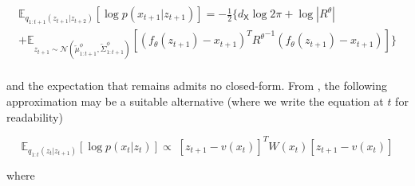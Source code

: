 \documentclass{article}
\newcommand{\1}{\mathbbm{1}}
\newcommand{\eqsp}{\;}
\newcommand{\expect}[2]{\mathbb{E}_{#1}\left[#2\right]}
\newcommand{\gaussian}[2]{\mathcal{N}\left( #1, #2 \right)}
\newcommand{\backward}[1]{\overleftarrow{#1}}
\newcommand{\vbackward}[1]{q_{1:#1}(z_{#1}|z_{#1 + 1})}
\newcommand{\vbackwardparam}[2]{\backward{#1}_{1:#2}^\phi}
\newcommand{\vbackwardmean}[1]{\vbackwardparam{\mu}{#1}}
\newcommand{\vbackwardcov}[1]{\vbackwardparam{\Sigma}{#1}}
\newcommand{\inv}[1]{{#1}^{-1}}
\newcommand{\quadform}[2]{#1^T #2 #1}
\begin{document}
\begin{multline*}
\expect{q_{1:t+1}(z_{t+1}|z_{t+2})}{\log p(x_{t+1}|z_{t+1})} = -\frac{1}{2}\{d_{\mathsf{X}}\log 2\pi + \log |R^\theta| \\
    + \expect{z_{t+1} \sim \gaussian{\vbackwardmean{t+1}}{\vbackwardcov{t+1}}}{\quadform{(f_\theta(z_{t+1}) - x_{t+1})}{\inv{R^\theta}}}\} \\
\end{multline*}

and the expectation that remains admits no closed-form. From \cite{johnson}, the following approximation may be a suitable alternative (where we write the equation at $t$ for readability)

\begin{equation}
    \expect{\vbackward{t}}{\log p(x_t|z_t)} \propto \eqsp \quadform{[z_{t+1} - v(x_t)]}{W(x_t)}
\end{equation}

where 


\appendix
\end{document}

